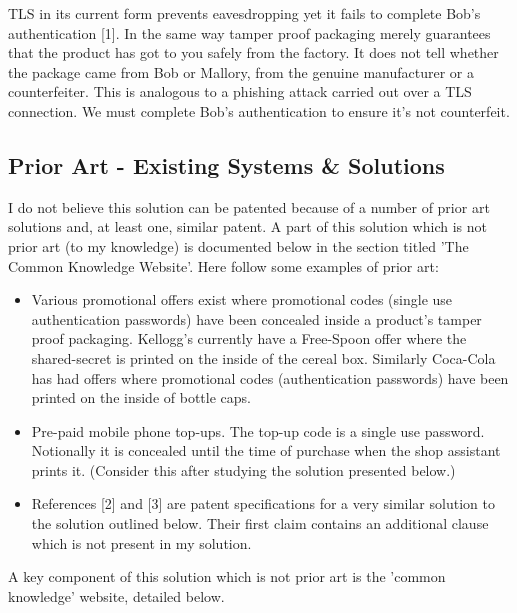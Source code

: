 \documentclass[smallextended]{svjour3}       	\smartqed  \usepackage{graphicx}
\begin{document}
TLS in its current form prevents eavesdropping yet it fails to complete Bob's authentication [1]. In the same way tamper proof packaging merely guarantees that the product has got to you safely from the factory. It does not tell whether the package came from Bob or Mallory, from the genuine manufacturer or a counterfeiter. This is analogous to a phishing attack carried out over a TLS connection. We must complete Bob's authentication to ensure it's not counterfeit.

\subsection{Prior Art - Existing Systems \& Solutions}

I do not believe this solution can be patented because of a number of prior art solutions and, at least one, similar patent. A part of this solution which is not prior art (to my knowledge) is documented below in the section titled 'The Common Knowledge Website'. Here follow some examples of prior art:

\vspace{1mm}

\begin{itemize}
  \item Various promotional offers exist where promotional codes (single use authentication passwords) have been concealed inside a product's tamper proof packaging. Kellogg's currently have a Free-Spoon offer where the shared-secret is printed on the inside of the cereal box. Similarly Coca-Cola has had offers where promotional codes (authentication passwords) have been printed on the inside of bottle caps.

  \item Pre-paid mobile phone top-ups. The top-up code is a single use password. Notionally it is concealed until the time of purchase when the shop assistant prints it. (Consider this after studying the solution presented below.)

  \item References [2] and [3] are patent specifications for a very similar solution to the solution outlined below. Their first claim contains an additional clause which is not present in my solution.
\end{itemize}

\vspace{1mm}

A key component of this solution which is not prior art is the 'common knowledge' website, detailed below.
\end{document}
